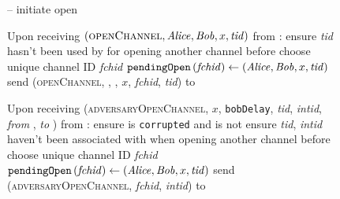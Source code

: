   \begin{figure}[H]
    \begin{systembox}{\fpaynet{} -- initiate open}
      \begin{algorithmic}[1]
        \State Upon receiving $\left(\textsc{openChannel}, \mathit{Alice}, \mathit{Bob}, x,
        \mathit{tid}\right)$ from \alice:
        \Indent
          \State ensure \textit{tid} hasn't been used by \alice{} for opening
          another channel before
          \label{alg:fpaynet:open:valid}
          \State choose unique channel ID \textit{fchid}
          \State $\mathtt{pendingOpen}\left(\mathit{fchid}\right) \gets
          \left(\mathit{Alice}, \mathit{Bob}, x, \mathit{tid}\right)$
          \State send (\textsc{openChannel}, \alice, \bob, $x$, \textit{fchid},
          \textit{tid}) to \simulator
        \EndIndent
        \Statex

        \State Upon receiving (\textsc{adversaryOpenChannel}, $x$,
        \texttt{bobDelay}, \textit{tid}, \textit{intid}, \textit{from} \alice,
        \textit{to} \bob) from \simulator:
        \label{alg:fpaynet:open:adv}
        \Indent
          \State ensure \alice{} is \texttt{corrupted} and \bob{} is not
          \State ensure \textit{tid}, \textit{intid} haven't been associated
          with \alice{} when opening another channel before
          \label{alg:fpaynet:open:adversary:valid}
          \State choose unique channel ID \textit{fchid}
          \State $\mathtt{pendingOpen}\left(\mathit{fchid}\right) \gets
          \left(\mathit{Alice}, \mathit{Bob}, x, \mathit{tid}\right)$
          \State send (\textsc{adversaryOpenChannel}, \textit{fchid},
          \textit{intid}) to \simulator
          \label{alg:fpaynet:open:adv:send}
        \EndIndent
      \end{algorithmic}
    \end{systembox}
    \caption{}
    \label{alg:fpaynet:open:init}
  \end{figure}

